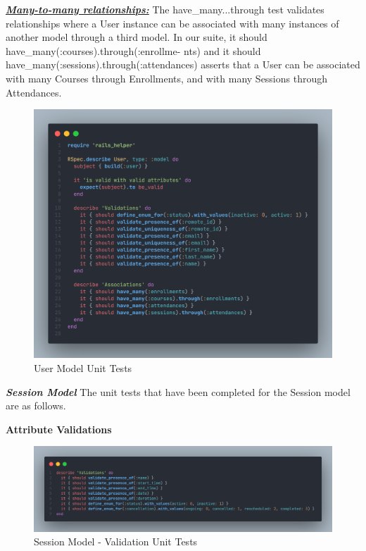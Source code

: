\begin{justify}
\vspace{0.25cm}
\noindent\textbf{\textit{\underline{Many-to-many relationships:}}} The have\_many...through test validates relationships where a User instance can be associated with many instances of another model through a third model. In our suite, it { should have\_many(:courses).through(:enrollme- nts) } and it { should have\_many(:sessions).through(:attendances) } asserts that a User can be associated with many Courses through Enrollments, and with many Sessions through Attendances.


    \begin{figure}[H]
        \centerline{\includegraphics[width=140mm,scale=1]{figures/implementation_and_testing/testing/AUT/user/all.png}}
        \caption{User Model Unit Tests}
        \label{User Model Unit Tests}
    \end{figure}




\newendline \textbf{\textit{Session Model}}\newendline
The unit tests that have been completed for the Session model are as follows.

\vspace{0.25cm}
\newendline
\textbf{Attribute Validations}

    \begin{figure}[H]
        \centerline{\includegraphics[width=140mm,scale=1]{figures/implementation_and_testing/testing/AUT/session/validations.png}}
        \caption{Session Model - Validation Unit Tests}
        \label{Session Model - Validation Unit Tests}
    \end{figure}


\end{justify}
